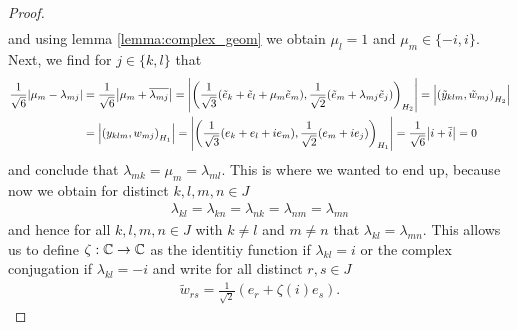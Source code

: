 \begin{proof}
\begin{align*}
	\end{align*}
	and using lemma \ref{lemma:complex_geom} we obtain $\mu_l = 1$ and $\mu_m \in \{-i, i\}$. Next, we find for $j \in \{k,l\}$ that
	\begin{align*}
		\frac{1}{\sqrt{6}} {\left | \mu_m - \lambda_{mj} \right |} &= \frac{1}{\sqrt{6}} {\left | \mu_m + \overline{\lambda_{mj}} \right |} = {\left | {\left ( \frac{1}{\sqrt{3}}(\tilde{e}_k + \tilde{e}_l + \mu_m \tilde{e}_m), \frac{1}{\sqrt{2}}(\tilde{e}_m + \lambda_{mj} \tilde{e}_j) \right )}_{H_2} \right |} = {\left | {\left ( \tilde{y}_{klm}, \tilde{w}_{mj} \right )}_{H_2} \right |} \\
		&= {\left | {\left ( y_{klm}, w_{mj} \right )}_{H_1} \right |} = {\left | {\left ( \frac{1}{\sqrt{3}}(e_k + e_l + ie_m), \frac{1}{\sqrt{2}}(e_m + ie_j) \right )}_{H_1} \right |} = \frac{1}{\sqrt{6}}{\left | i + \overline{i} \right |} = 0
	\end{align*}
	and conclude that $\lambda_{mk} = \mu_m = \lambda_{ml}$. This is where we wanted to end up, because now we obtain for distinct $k,l,m,n \in J$
	\begin{align*}
		\lambda_{kl} = \lambda_{kn} = \lambda_{nk} = \lambda_{nm} = \lambda_{mn}
	\end{align*}
	and hence for all $k,l,m,n \in J$ with $k \neq l$ and $m \neq n$ that $\lambda_{kl} = \lambda_{mn}$. This allows us to define $\zeta: \mathbb{C} \to \mathbb{C}$ as the identitiy function if $\lambda_{kl} = i$ or the complex conjugation if $\lambda_{kl} = -i$ and write for all distinct $r,s \in J$ 
	\begin{align*}
		\tilde{w}_{rs} = \frac{1}{\sqrt{2}}(e_r + \zeta(i) e_s).
	\end{align*}
	

\end{proof}
